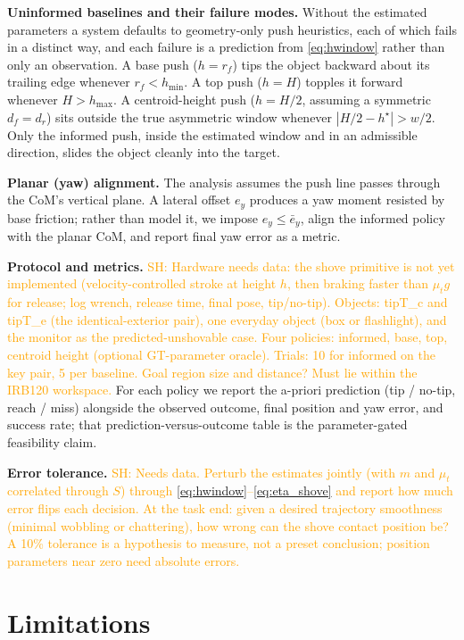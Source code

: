 \documentclass[10pt, conference]{IEEEtran}
\newcommand{\sh}[1]{\textcolor{orange}{SH: #1}}
\begin{document}
\noindent \textbf{Uninformed baselines and their failure modes.} Without the estimated parameters a system defaults to geometry-only push heuristics, each of which fails in a distinct way, and each failure is a prediction from \eqref{eq:hwindow} rather than only an observation. A base push ($h = r_f$) tips the object backward about its trailing edge whenever $r_f < h_{\min}$. A top push ($h = H$) topples it forward whenever $H > h_{\max}$. A centroid-height push ($h = H/2$, assuming a symmetric $d_f = d_r$) sits outside the true asymmetric window whenever $|H/2 - h^{\star}| > w/2$. Only the informed push, inside the estimated window and in an admissible direction, slides the object cleanly into the target.

\noindent \textbf{Planar (yaw) alignment.} The analysis assumes the push line passes through the CoM's vertical plane. A lateral offset $e_y$ produces a yaw moment resisted by base friction; rather than model it, we impose $e_y \le \bar e_y$, align the informed policy with the planar CoM, and report final yaw error as a metric.

\noindent \textbf{Protocol and metrics.} \sh{Hardware needs data: the shove primitive is not yet implemented (velocity-controlled stroke at height $h$, then braking faster than $\mu_t g$ for release; log wrench, release time, final pose, tip/no-tip). Objects: tipT\_c and tipT\_e (the identical-exterior pair), one everyday object (box or flashlight), and the monitor as the predicted-unshovable case. Four policies: informed, base, top, centroid height (optional GT-parameter oracle). Trials: 10 for informed on the key pair, 5 per baseline. Goal region size and distance? Must lie within the IRB120 workspace.} For each policy we report the a-priori prediction (tip / no-tip, reach / miss) alongside the observed outcome, final position and yaw error, and success rate; that prediction-versus-outcome table is the parameter-gated feasibility claim.

\noindent \textbf{Error tolerance.} \sh{Needs data. Perturb the estimates jointly (with $m$ and $\mu_t$ correlated through $S$) through \eqref{eq:hwindow}--\eqref{eq:eta_shove} and report how much error flips each decision. At the task end: given a desired trajectory smoothness (minimal wobbling or chattering), how wrong can the shove contact position be? A 10\% tolerance is a hypothesis to measure, not a preset conclusion; position parameters near zero need absolute errors.}

\section{Limitations} \label{sec:limitations}
\end{document}
